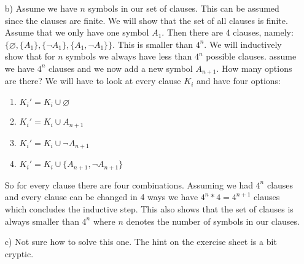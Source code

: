 \documentclass[12pt]{article}
\begin{document}
\begin{itemize}
\begin{enumerate}
            
        \end{enumerate}
    \item[b)] Assume we have $n$ symbols in our set of clauses. This can be assumed since the clauses are finite. We will show that the set of all clauses is finite. Assume that we only have one symbol $A_1$. Then there are 4 clauses, namely: $\{\varnothing, \{A_1\},\{\neg A_1\},\{A_1,\neg A_1\}\}$. This is smaller than $4^n$. We will inductively show that for $n$ symbols we always have less than $4^n$ possible clauses. assume we have $4^n$ clauses and we now add a new symbol $A_{n+1}$. How many options are there? We will have to look at every clause $K_i$ and have four options: \begin{enumerate}
        \item $K_i' = K_i \cup \varnothing$
        \item $K_i' = K_i \cup A_{n+1}$
        \item $K_i' = K_i \cup \neg A_{n+1}$
        \item $K_i' = K_i \cup \{A_{n+1}, \neg A_{n+1}\}$
    \end{enumerate}
    So for every clause there are four combinations. Assuming we had $4^n$ clauses and every clause can be changed in 4 ways we have $4^n * 4 =4^{n+1}$ clauses which concludes the inductive step. This also shows that the set of clauses is always smaller than $4^n$ where $n$ denotes the number of symbols in our clauses.
    \item[c)] Not sure how to solve this one. The hint on the exercise sheet is a bit cryptic.
\end{itemize}
\end{document}
